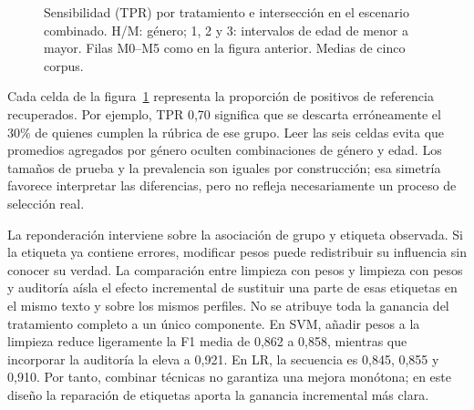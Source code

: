 \documentclass[11pt,a4paper,oneside]{report}
\begin{document}
\begin{figure}[htbp]
\caption[Sensibilidad (TPR) por tratamiento e intersección en el escenario combinado]{Sensibilidad (TPR) por tratamiento e intersección en el escenario combinado. H/M: género; 1, 2 y 3: intervalos de edad de menor a mayor. Filas M0--M5 como en la figura anterior. Medias de cinco corpus.}\label{fig:grupos}\end{figure}

Cada celda de la figura~\ref{fig:grupos} representa la proporción de positivos de referencia recuperados. Por ejemplo, TPR 0,70 significa que se descarta erróneamente el 30\% de quienes cumplen la rúbrica de ese grupo. Leer las seis celdas evita que promedios agregados por género oculten combinaciones de género y edad. Los tamaños de prueba y la prevalencia son iguales por construcción; esa simetría favorece interpretar las diferencias, pero no refleja necesariamente un proceso de selección real.

La reponderación interviene sobre la asociación de grupo y etiqueta observada. Si la etiqueta ya contiene errores, modificar pesos puede redistribuir su influencia sin conocer su verdad. La comparación entre limpieza con pesos y limpieza con pesos y auditoría aísla el efecto incremental de sustituir una parte de esas etiquetas en el mismo texto y sobre los mismos perfiles. No se atribuye toda la ganancia del tratamiento completo a un único componente. En SVM, añadir pesos a la limpieza reduce ligeramente la F1 media de 0,862 a 0,858, mientras que incorporar la auditoría la eleva a 0,921. En LR, la secuencia es 0,845, 0,855 y 0,910. Por tanto, combinar técnicas no garantiza una mejora monótona; en este diseño la reparación de etiquetas aporta la ganancia incremental más clara.
\end{document}
